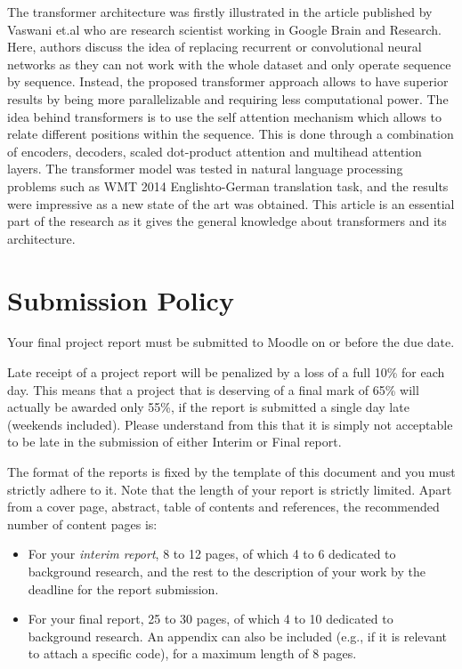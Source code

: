 \documentclass[]{final_report}
\begin{document}
The transformer architecture was firstly illustrated in the article published by Vaswani et.al \cite{vaswani2017attention} who are research scientist working in Google Brain and Research. Here, authors discuss the idea of replacing recurrent or convolutional neural networks as they can not work with the whole dataset and only operate sequence by sequence. Instead, the proposed transformer approach allows to have superior results by being more parallelizable and requiring less computational power. The idea behind transformers is to use the self attention mechanism which allows to relate different positions within the sequence. This is done through a combination of encoders, decoders, scaled dot-product attention and  multihead attention layers. The transformer model was tested in natural language processing problems such as WMT 2014 Englishto-German translation task, and the results were impressive as a new state of the art was obtained. This article is an essential part of the research as it gives the general knowledge about transformers and its architecture. 





\chapter{\label{chapter2}Submission Policy}

Your final project report must be submitted to Moodle on or before the due date.

Late receipt of a project report will be penalized by a loss of a full 10\% for each day. This means that a project that is deserving of a final mark of 65\% will actually be awarded only 55\%, if the report is submitted a single day late (weekends included). Please understand from this that it is simply not acceptable to be late in the submission of either Interim or Final report.

The format of the reports is fixed by the template of this document and you must  strictly adhere to it.  Note that the length of your report is strictly limited. Apart from a cover page, abstract, table of contents and references, the recommended number of content pages is:

\begin{itemize}
\item For your \emph{interim report}, 8 to 12 pages, of which 4 to 6 dedicated to background research, and the rest to the description of your work by the deadline for the report submission.

\item For your final report, 25 to 30 pages, of which 4 to 10 dedicated to background research. An appendix can also be included (e.g., if it is relevant to attach a specific code), for a maximum length of 8 pages.
\end{itemize}
\end{document}
